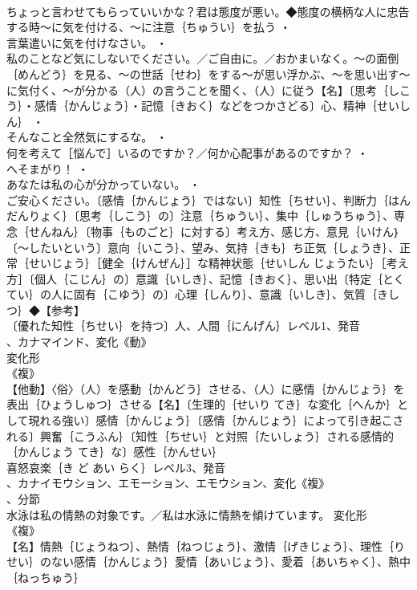 \documentclass[8pt]{extreport}
\begin{document}
\begin{CJK}{UTF8}{min}
\\	ちょっと言わせてもらっていいかな？君は態度が悪い。◆態度の横柄な人に忠告する時～に気を付ける、～に注意｛ちゅうい｝を払う ・
\\	言葉遣いに気を付けなさい。 ・
\\	私のことなど気にしないでください。／ご自由に。／おかまいなく。～の面倒｛めんどう｝を見る、～の世話｛せわ｝をする～が思い浮かぶ、～を思い出す～に気付く、～が分かる（人）の言うことを聞く、（人）に従う【名】〔思考｛しこう｝・感情｛かんじょう｝・記憶｛きおく｝などをつかさどる〕心、精神｛せいしん｝ ・
\\	そんなこと全然気にするな。 ・
\\	何を考えて［悩んで］いるのですか？／何か心配事があるのですか？ ・
\\	へそまがり！ ・
\\	あなたは私の心が分かっていない。 ・
\\	ご安心ください。〔感情｛かんじょう｝ではない〕知性｛ちせい｝、判断力｛はんだんりょく｝〔思考｛しこう｝の〕注意｛ちゅうい｝、集中｛しゅうちゅう｝、専念｛せんねん｝〔物事｛ものごと｝に対する〕考え方、感じ方、意見｛いけん｝〔～したいという〕意向｛いこう｝、望み、気持｛きも｝ち正気｛しょうき｝、正常｛せいじょう｝［健全｛けんぜん｝］な精神状態｛せいしん じょうたい｝［考え方］〔個人｛こじん｝の〕意識｛いしき｝、記憶｛きおく｝、思い出〔特定｛とくてい｝の人に固有｛こゆう｝の〕心理｛しんり｝、意識｛いしき｝、気質｛きしつ｝◆【参考】
\\	〔優れた知性｛ちせい｝を持つ〕人、人間｛にんげん｝レベル1、発音
\\	、カナマインド、変化《動》
\\	変化形 
\\	《複》
\\	【他動】〈俗〉（人）を感動｛かんどう｝させる、（人）に感情｛かんじょう｝を表出｛ひょうしゅつ｝させる【名】〔生理的｛せいり てき｝な変化｛へんか｝として現れる強い〕感情｛かんじょう｝〔感情｛かんじょう｝によって引き起こされる〕興奮｛こうふん｝〔知性｛ちせい｝と対照｛たいしょう｝される感情的｛かんじょう てき｝な〕感性｛かんせい｝
\\	喜怒哀楽｛き ど あい らく｝レベル3、発音
\\	、カナイモウション、エモーション、エモウション、変化《複》
\\	、分節
\\	水泳は私の情熱の対象です。／私は水泳に情熱を傾けています。	変化形 
\\	《複》
\\	【名】情熱｛じょうねつ｝、熱情｛ねつじょう｝、激情｛げきじょう｝、理性｛りせい｝のない感情｛かんじょう｝愛情｛あいじょう｝、愛着｛あいちゃく｝、熱中｛ねっちゅう｝

\end{CJK}
\end{document}
